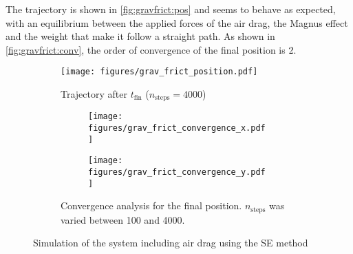 The trajectory is shown in \autoref{fig:gravfrict:pos} and seems to behave as expected, with an equilibrium between the applied forces of the air drag, the Magnus effect and the weight that make it follow a straight path. As shown in \autoref{fig:gravfrict:conv}, the order of convergence of the final position is 2.

\begin{figure}[h]
    \centering
    \begin{subfigure}{0.49\linewidth}
        \centering
        \texttt{[image: figures/grav\_frict\_position.pdf]}
        \caption{Trajectory after $t_\textrm{fin}$ ($n_\textrm{steps}=4000$)}
        \label{fig:gravfrict:pos}
    \end{subfigure}%
    \hspace*{0.2cm}
    \begin{subfigure}{0.45\linewidth}
        \begin{subfigure}{\linewidth}
            \centering
            \texttt{[image: figures/grav\_frict\_convergence\_x.pdf]}
        \end{subfigure}
        \begin{subfigure}{\linewidth}
            \centering
            \texttt{[image: figures/grav\_frict\_convergence\_y.pdf]}
        \end{subfigure}
        \caption{Convergence analysis for the final position. $n_\textrm{steps}$ was varied between 100 and 4000.}
        \label{fig:gravfrict:conv}
    \end{subfigure}
    \caption{Simulation of the system including air drag using the SE method}
\end{figure}

